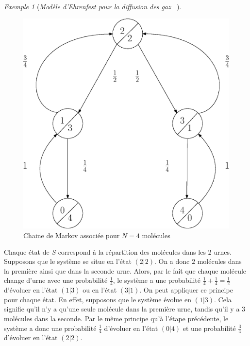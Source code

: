 \documentclass[12pt,a4paper]{report}
\theoremstyle{definition}%
\theoremstyle{remark}
\newtheorem{example}{Exemple}[chapter]
\begin{document}
\begin{example}[\textit{Modèle d'Ehrenfest pour la diffusion des gaz ~\cite{Course3}}]
	\begin{figure}[H]
		\centering
		\includegraphics[scale=0.4]{figures/Ehrenfest.eps}
		\caption{Chaine de Markov associée pour $N=4$ molécules}
		\label{ehrenfestCM}
	\end{figure}
	Chaque état de $S$ correspond à la répartition des molécules dans les 2 urnes. Supposons que le système se situe en l'état $(2 | 2)$. On a donc $2$ molécules dans la première ainsi que dans la seconde urne. Alors, par le fait que chaque molécule change d'urne avec une probabilité $\frac{1}{4}$, le système a une probabilité $\frac{1}{4} + \frac{1}{4} = \frac{1}{2}$ d'évoluer en l'état $(1 | 3)$ ou en l'état $(3 | 1 )$. On peut appliquer ce principe pour chaque état. En effet, supposons que le système évolue en $(1 | 3)$. Cela signifie qu'il n'y a qu'une seule molécule dans la première urne, tandis qu'il y a 3 molécules dans la seconde. Par le même principe qu'à l'étape précédente, le système a donc une probabilité $\frac{1}{4}$ d'évoluer en l'état $(0 | 4)$ et une probabilité $\frac{3}{4}$ d'évoluer en l'état $(2 | 2)$.
	\\


\end{example}
\end{document}
